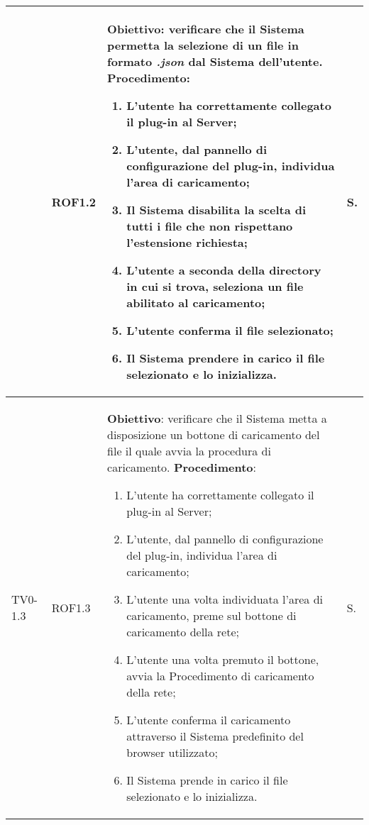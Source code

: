 \begin{longtable}{|C{.15\textwidth}|C{.13\textwidth}|m{.65\textwidth}|C{.08\textwidth}|}
   & ROF1.2 &
	\textbf{Obiettivo}: verificare che il Sistema permetta la selezione di un file in formato \textit{.json} dal Sistema dell'utente.\newline
	\textbf{Procedimento}:
	\begin{enumerate}
		\item L'utente ha correttamente collegato il plug-in al Server;
		\item L'utente, dal pannello di configurazione del plug-in, individua l'area di caricamento;
		\item Il Sistema disabilita la scelta di tutti i file che non rispettano l'estensione richiesta;
		\item L'utente a seconda della directory in cui si trova, seleziona un file abilitato al caricamento;
		\item L'utente conferma il file selezionato;
		\item Il Sistema prendere in carico il file selezionato e lo inizializza.
	\end{enumerate}
	& S. \\
\hline

 TV0-1.3 & ROF1.3 &
	\textbf{Obiettivo}: verificare che il Sistema metta a disposizione un bottone di caricamento del file il quale avvia la procedura di caricamento. \newline
	\textbf{Procedimento}:
	\begin{enumerate}
		\item L'utente ha correttamente collegato il plug-in al Server;
		\item L'utente, dal pannello di configurazione del plug-in, individua l'area di caricamento;
		\item L'utente una volta individuata l'area di caricamento, preme sul bottone di caricamento della rete;
		\item L'utente una volta premuto il bottone, avvia la Procedimento di caricamento della rete;
		\item L'utente conferma il caricamento attraverso il Sistema predefinito del browser utilizzato;
		\item Il Sistema prende in carico il file selezionato e lo inizializza.
	\end{enumerate}
	& S. \\
\hline


\end{longtable}
